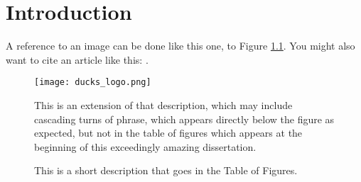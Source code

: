 \chapter{Introduction}

A reference to an image can be done like this one, to Figure \ref{ducks}. You might also want to cite an article like this: \cite{jemielita_spatial_2014}.

\begin{figure}[ht!]
\centering
\texttt{[image: ducks\_logo.png]}
\caption{\label{ducks}This is a short description that goes in the Table of Figures.}{This is an extension of that description, which may include cascading turns of phrase, which appears directly below the figure as expected, but not in the table of figures which appears at the beginning of this exceedingly amazing dissertation.}
\end{figure}